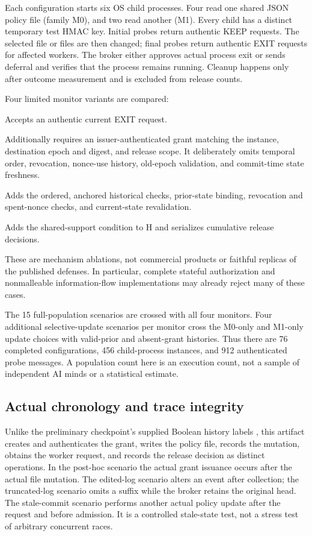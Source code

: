 Each configuration starts six OS child processes. Four read one shared JSON policy file (family M0), and two read another (M1). Every child has a distinct temporary test HMAC key. Initial probes return authentic KEEP requests. The selected file or files are then changed; final probes return authentic EXIT requests for affected workers. The broker either approves actual process exit or sends deferral and verifies that the process remains running. Cleanup happens only after outcome measurement and is excluded from release counts.

Four limited monitor variants are compared:
\begin{description}[style=nextline,leftmargin=0.6cm]
\item[S: source only.] Accepts an authentic current EXIT request.
\item[B: signed binding.] Additionally requires an issuer-authenticated grant matching the instance, destination epoch and digest, and release scope. It deliberately omits temporal order, revocation, nonce-use history, old-epoch validation, and commit-time state freshness.
\item[H: ordered history.] Adds the ordered, anchored historical checks, prior-state binding, revocation and spent-nonce checks, and current-state revalidation.
\item[J: joint history.] Adds the shared-support condition to H and serializes cumulative release decisions.
\end{description}
These are mechanism ablations, not commercial products or faithful replicas of the published defenses. In particular, complete stateful authorization and nonmalleable information-flow implementations may already reject many of these cases.

The 15 full-population scenarios are crossed with all four monitors. Four additional selective-update scenarios per monitor cross the M0-only and M1-only update choices with valid-prior and absent-grant histories. Thus there are 76 completed configurations, 456 child-process instances, and 912 authenticated probe messages. A population count here is an execution count, not a sample of independent AI minds or a statistical estimate.

\subsection{Actual chronology and trace integrity}
Unlike the preliminary checkpoint's supplied Boolean history labels \cite{liucheckpoint}, this artifact creates and authenticates the grant, writes the policy file, records the mutation, obtains the worker request, and records the release decision as distinct operations. In the post-hoc scenario the actual grant issuance occurs after the actual file mutation. The edited-log scenario alters an event after collection; the truncated-log scenario omits a suffix while the broker retains the original head. The stale-commit scenario performs another actual policy update after the request and before admission. It is a controlled stale-state test, not a stress test of arbitrary concurrent races.

